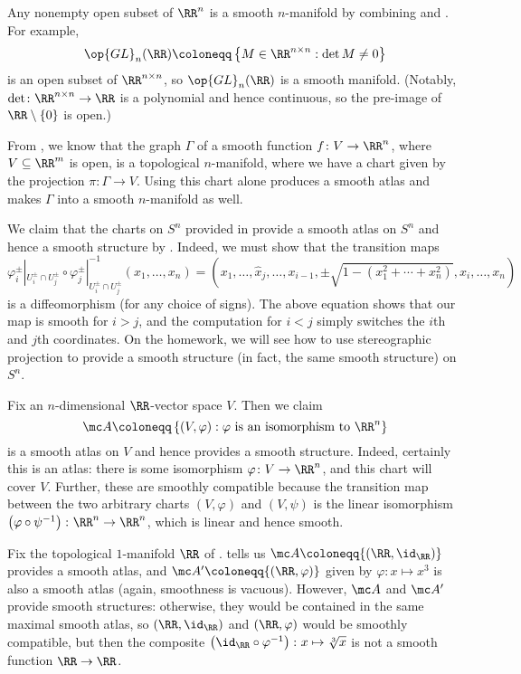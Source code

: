 \documentclass[../notes.tex]{subfiles}
\begin{document}
\begin{example}
	Any nonempty open subset of $\RR^n$ is a smooth $n$-manifold by combining  and . For example,
	\[\op{GL}_n(\RR)\coloneqq\left\{M\in\RR^{n\times n}:\det M\ne0\right\}\]
	is an open subset of $\RR^{n\times n}$, so $\op{GL}_n(\RR)$ is a smooth manifold. (Notably, $\det\colon\RR^{n\times n}\to\RR$ is a polynomial and hence continuous, so the pre-image of $\RR\setminus\{0\}$ is open.)
\end{example}
\begin{example}
	From , we know that the graph $\Gamma$ of a smooth function $f\colon V\to\RR^n$, where $V\subseteq\RR^m$ is open, is a topological $n$-manifold, where we have a chart given by the projection $\pi\colon\Gamma\to V$. Using this chart alone produces a smooth atlas and makes $\Gamma$ into a smooth $n$-manifold as well.
\end{example}
\begin{example}
	We claim that the charts on $S^n$ provided in  provide a smooth atlas on $S^n$ and hence a smooth structure by . Indeed, we must show that the transition maps
	\[\varphi_i^\pm|_{U_i^\pm\cap U_j^\pm}\circ\varphi_j^\pm|_{U_i^\pm\cap U_j^\pm}^{-1}(x_1,\ldots,x_n)=\left(x_1,\ldots,\widehat x_j,\ldots,x_{i-1},\pm\sqrt{1-\left(x_1^2+\cdots+x_n^2\right)},x_i,\ldots,x_n\right)\]
	is a diffeomorphism (for any choice of signs). The above equation shows that our map is smooth for $i>j$, and the computation for $i<j$ simply switches the $i$th and $j$th coordinates. On the homework, we will see how to use stereographic projection to provide a smooth structure (in fact, the same smooth structure) on $S^n$.
\end{example}
\begin{example}
	Fix an $n$-dimensional $\RR$-vector space $V$. Then we claim
	\[\mc A\coloneqq\left\{(V,\varphi):\varphi\text{ is an isomorphism to }\RR^n\right\}\]
	is a smooth atlas on $V$ and hence provides a smooth structure. Indeed, certainly this is an atlas: there is some isomorphism $\varphi\colon V\to\RR^n$, and this chart will cover $V$. Further, these are smoothly compatible because the transition map between the two arbitrary charts $(V,\varphi)$ and $(V,\psi)$ is the linear isomorphism $\left(\varphi\circ\psi^{-1}\right)\colon\RR^n\to\RR^n$, which is linear and hence smooth.
\end{example}
\begin{example}
	Fix the topological $1$-manifold $\RR$ of .  tells us $\mc A\coloneqq\{(\RR,{\id_\RR})\}$ provides a smooth atlas, and $\mc A'\coloneqq\{(\RR,\varphi)\}$ given by $\varphi\colon x\mapsto x^3$ is also a smooth atlas (again, smoothness is vacuous). However, $\mc A$ and $\mc A'$ provide smooth structures: otherwise, they would be contained in the same maximal smooth atlas, so $(\RR,{\id_\RR})$ and $(\RR,\varphi)$ would be smoothly compatible, but then the composite $\left({\id_\RR}\circ\varphi^{-1}\right)\colon x\mapsto\sqrt[3]x$ is not a smooth function $\RR\to\RR$.
\end{example}
\end{document}
